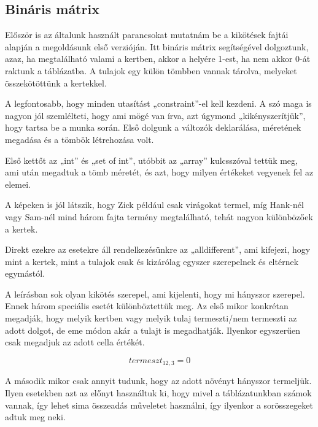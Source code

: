 \documentclass[12pt,a4paper,twoside, openright]{report}
\begin{document}
\subsection{Bináris mátrix}

    Először is az általunk használt parancsokat mutatnám be a kikötések fajtái alapján a megoldásunk első verzióján.
    Itt bináris mátrix segítségével dolgoztunk, azaz, ha megtalálható valami a kertben, akkor a helyére 1-est, ha nem akkor 0-át raktunk a táblázatba.
    A tulajok egy külön tömbben vannak tárolva, melyeket összekötöttünk a kertekkel.


    A legfontosabb, hogy minden utasítást „constraint”-el kell kezdeni.
    A szó maga is nagyon jól szemlélteti, hogy ami mögé van írva, azt úgymond „kikényszerítjük”, hogy tartsa be a munka során.
    Első dolgunk a változók deklarálása, méretének megadása és a tömbök létrehozása volt.

    Első kettőt az „int” és „set of int”, utóbbit az „array” kulcsszóval tettük meg, ami után megadtuk a tömb méretét, és azt, hogy milyen értékeket vegyenek fel az elemei.


    A képeken is jól látszik, hogy Zick például csak virágokat termel, míg Hank-nél vagy 
    Sam-nél mind három fajta termény megtalálható, tehát nagyon különbözőek a kertek.

    Direkt ezekre az esetekre áll rendelkezésünkre az „alldifferent”, ami kifejezi, hogy mint a kertek, mint a tulajok csak és kizárólag egyszer szerepelnek és eltérnek egymástól.


    A leírásban sok olyan kikötés szerepel, ami kijelenti, hogy mi hányszor szerepel.
    Ennek három speciális esetét különböztettük meg.
    Az első mikor konkrétan megadják, hogy melyik kertben vagy melyik tulaj termeszti/nem termeszti az adott dolgot, de eme módon akár a tulajt is megadhatják.
    Ilyenkor egyszerűen csak megadjuk az adott cella értékét.

    \begin{equation}
    termeszt_{12,3}=0 
    \end{equation}

    A második mikor csak annyit tudunk, hogy az adott növényt hányszor termeljük.
    Ilyen esetekben azt az előnyt használtuk ki, hogy mivel a táblázatunkban számok vannak, így lehet sima összeadás műveletet használni, így ilyenkor a sorösszegeket adtuk meg neki.
    
\end{document}
